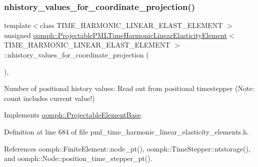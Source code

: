 \subsubsection{\texorpdfstring{nhistory\+\_\+values\+\_\+for\+\_\+coordinate\+\_\+projection()}{nhistory\_values\_for\_coordinate\_projection()}}
{\footnotesize\ttfamily template$<$class T\+I\+M\+E\+\_\+\+H\+A\+R\+M\+O\+N\+I\+C\+\_\+\+L\+I\+N\+E\+A\+R\+\_\+\+E\+L\+A\+S\+T\+\_\+\+E\+L\+E\+M\+E\+NT $>$ \\
unsigned \hyperlink{classoomph_1_1ProjectablePMLTimeHarmonicLinearElasticityElement}{oomph\+::\+Projectable\+P\+M\+L\+Time\+Harmonic\+Linear\+Elasticity\+Element}$<$ T\+I\+M\+E\+\_\+\+H\+A\+R\+M\+O\+N\+I\+C\+\_\+\+L\+I\+N\+E\+A\+R\+\_\+\+E\+L\+A\+S\+T\+\_\+\+E\+L\+E\+M\+E\+NT $>$\+::nhistory\+\_\+values\+\_\+for\+\_\+coordinate\+\_\+projection (\begin{DoxyParamCaption}{ }\end{DoxyParamCaption})\hspace{0.3cm}{\ttfamily [inline]}, {\ttfamily [virtual]}}



Number of positional history values\+: Read out from positional timestepper (Note\+: count includes current value!) 



Implements \hyperlink{classoomph_1_1ProjectableElementBase_ab4ecd0cd24000a3ed675dc7198203c1f}{oomph\+::\+Projectable\+Element\+Base}.



Definition at line 684 of file pml\+\_\+time\+\_\+harmonic\+\_\+linear\+\_\+elasticity\+\_\+elements.\+h.



References oomph\+::\+Finite\+Element\+::node\+\_\+pt(), oomph\+::\+Time\+Stepper\+::ntstorage(), and oomph\+::\+Node\+::position\+\_\+time\+\_\+stepper\+\_\+pt().

\mbox{\label{classoomph_1_1ProjectablePMLTimeHarmonicLinearElasticityElement_a0b75e51a7ed1b8bb56238134b2c02dae}} 
